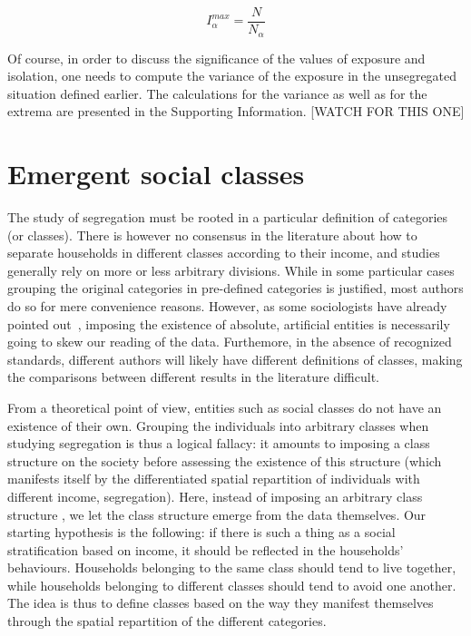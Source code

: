 \begin{equation}
    I_\alpha^{max} = \frac{N}{N_\alpha}
\end{equation}

Of course, in order to discuss the significance of the values of exposure and
isolation, one needs to compute the variance of the exposure in the unsegregated
situation defined earlier. The calculations for the variance as well as for the
extrema are presented in the Supporting Information. [WATCH FOR THIS ONE]

\section{Emergent social classes}
\label{sec:the_emergent_social_classes}

The study of segregation must be rooted in a particular definition of categories
(or classes). There is however no consensus in the literature about how to
separate households in different classes according to their income, and studies
generally rely on more or less arbitrary divisions. While in some particular
cases grouping the original categories in pre-defined categories is justified,
most authors do so for mere convenience reasons. However, as some sociologists
have already pointed out~\cite{Emirbayer:1997}, imposing the existence of
absolute, artificial entities is necessarily going to skew our reading of the
data. Furthemore, in the absence of recognized standards, different authors will
likely have different definitions of classes, making the comparisons between
different results in the literature difficult. 

From a theoretical point of view, entities such as social classes do not have an
existence of their own. Grouping the individuals into arbitrary classes when
studying segregation is thus a logical fallacy: it amounts to imposing a class
structure on the society before assessing the existence of this structure (which
manifests itself by the differentiated spatial repartition of individuals with
different income, segregation). Here, instead of imposing an arbitrary class
structure , we let the class structure emerge from the data themselves. Our
starting hypothesis is the following: if there is such a thing as a social
stratification based on income, it should be reflected in the households'
behaviours. Households belonging to the same class should tend to live together,
while households belonging to different classes should tend to avoid one
another. The idea is thus to define classes based on the way they manifest
themselves through the spatial repartition of the different categories. 

